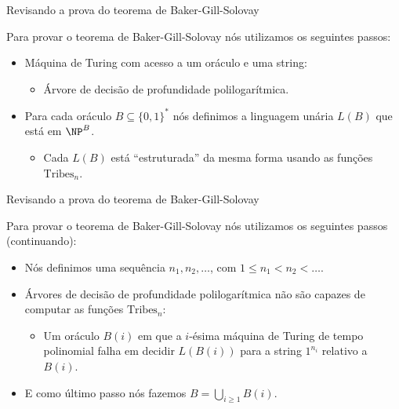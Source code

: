 \documentclass[landscape, 9pt]{beamer}
\newcommand{\binalph}{\{0, 1\}}
\newcommand{\Tribes}{\text{Tribes}}
\begin{document}
\begin{frame} {Revisando a prova do teorema de Baker-Gill-Solovay}

Para provar o teorema de Baker-Gill-Solovay nós utilizamos os seguintes passos:

\begin{itemize}

	\item Máquina de Turing com acesso a um oráculo e uma string:
	
	\begin{itemize}
	
		\item Árvore de decisão de profundidade polilogarítmica.
	
	\end{itemize}
	
	\item Para cada oráculo $B \subseteq \binalph^{*}$ nós definimos a linguagem unária $L(B)$ que está em $\NP^{B}$.
	
	\begin{itemize}
	
		\item Cada $L(B)$ está ``estruturada'' da mesma forma usando as funções $\Tribes_{n}$.
	
	\end{itemize}

\end{itemize}

\end{frame}


\begin{frame} {Revisando a prova do teorema de Baker-Gill-Solovay}

Para provar o teorema de Baker-Gill-Solovay nós utilizamos os seguintes passos (continuando):

\begin{itemize}

	\item Nós definimos uma sequência $n_{1}, n_{2}, \dots$, com $1 \leq n_{1} < n_{2} < \dots$.

	\item Árvores de decisão de profundidade polilogarítmica não são capazes de computar as funções $\Tribes_{n}$:
	
	\begin{itemize}
	
		\item Um oráculo $B(i)$ em que a $i$-ésima máquina de Turing de tempo polinomial falha em decidir $L(B(i))$ para a string $1^{n_{i}}$ relativo a $B(i)$.
	
	\end{itemize}
	
	\item E como último passo nós fazemos $B = \bigcup_{i \geq 1} B(i)$.

\end{itemize}

\end{frame}
\end{document}
